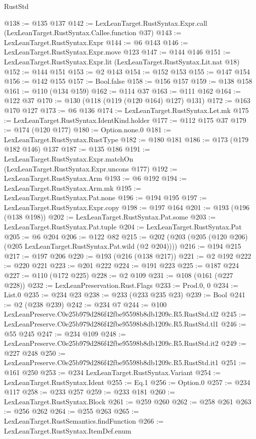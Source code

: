 \begin{lexlean}{RustStd}
\begin{coremodule}
@138 := @135 @137
@142 := LexLeanTarget.RustSyntax.Expr.call (LexLeanTarget.RustSyntax.Callee.function @37)
@143 := LexLeanTarget.RustSyntax.Expr
@144 := @6 @143
@146 := LexLeanTarget.RustSyntax.Expr.move @123
@147 := @144 @146
@151 := LexLeanTarget.RustSyntax.Expr.lit (LexLeanTarget.RustSyntax.Lit.nat @18)
@152 := @144 @151
@153 := @2 @143
@154 := @152 @153
@155 := @147 @154
@156 := @142 @155
@157 := Bool.false
@158 := @156 @157
@159 := @138 @158
@161 := @110 (@134 @159)
@162 := @114 @37
@163 := @111 @162
@164 := @122 @37
@170 := @130 (@118 (@119 (@120 @164) @127) @131)
@172 := @163 @170 @127
@173 := @6 @136
@174 := LexLeanTarget.RustSyntax.Let.mk
@175 := LexLeanTarget.RustSyntax.IdentKind.holder
@177 := @112 @175 @37
@179 := @174 (@120 @177)
@180 := Option.none.{0}
@181 := LexLeanTarget.RustSyntax.RustType
@182 := @180 @181
@186 := @173 (@179 @182 @146) @137
@187 := @135 @186
@191 := LexLeanTarget.RustSyntax.Expr.matchOn (LexLeanTarget.RustSyntax.Expr.uncons @177)
@192 := LexLeanTarget.RustSyntax.Arm
@193 := @6 @192
@194 := LexLeanTarget.RustSyntax.Arm.mk
@195 := LexLeanTarget.RustSyntax.Pat.none
@196 := @194 @195
@197 := LexLeanTarget.RustSyntax.Expr.copy
@198 := @197 @164
@201 := @193 (@196 (@138 @198))
@202 := LexLeanTarget.RustSyntax.Pat.some
@203 := LexLeanTarget.RustSyntax.Pat.tuple
@204 := LexLeanTarget.RustSyntax.Pat
@205 := @6 @204
@206 := @122 @82
@215 := @202 (@203 (@205 (@120 @206) (@205 LexLeanTarget.RustSyntax.Pat.wild (@2 @204))))
@216 := @194 @215
@217 := @197 @206
@220 := @193 (@216 (@138 @217))
@221 := @2 @192
@222 := @220 @221
@223 := @201 @222
@224 := @191 @223
@225 := @187 @224
@227 := @110 (@172 @225)
@228 := @2 @109
@231 := @108 (@161 (@227 @228))
@232 := LexLeanPreservation.Rust.Flags
@233 := Prod.{0, 0}
@234 := List.{0}
@235 := @234 @23
@238 := @233 (@233 @235 @23)
@239 := Bool
@241 := @2 (@238 @239)
@242 := @234 @7
@244 := @100 LexLeanPreserve.C0e25b979d286f42fbe95598b8db1209c.R5.RustStd.tl2
@245 := LexLeanPreserve.C0e25b979d286f42fbe95598b8db1209c.R5.RustStd.tl1
@246 := @55 @245
@247 := @234 @109
@248 := LexLeanPreserve.C0e25b979d286f42fbe95598b8db1209c.R5.RustStd.it2
@249 := @227 @248
@250 := LexLeanPreserve.C0e25b979d286f42fbe95598b8db1209c.R5.RustStd.it1
@251 := @161 @250
@253 := @234 LexLeanTarget.RustSyntax.Variant
@254 := LexLeanTarget.RustSyntax.Ident
@255 := Eq.{1}
@256 := Option.{0}
@257 := @234 @117
@258 := @233 @257
@259 := @233 @181
@260 := LexLeanTarget.RustSyntax.Block
@261 := @259 @260
@262 := @258 @261
@263 := @256 @262
@264 := @255 @263
@265 := LexLeanTarget.RustSemantics.findFunction
@266 := LexLeanTarget.RustSyntax.ItemDef.enum

\end{coremodule}
\end{lexlean}
